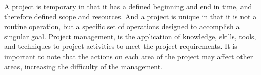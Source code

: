 A project is temporary in that it has a defined beginning and end in time, and therefore defined scope and resources.
And a project is unique in that it is not a routine operation, but a specific set of operations designed to accomplish a singular goal.
\linej
Project management, is the application of knowledge, skills, tools, and techniques to project activities to meet the project requirements\cite{pmi_project_management}.
It is important to note that the actions on each area of the project may affect other areas, increasing the difficulty of the management.
